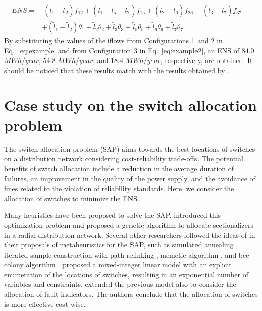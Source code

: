 \documentclass{article}
\begin{document}
\begin{align} 
	\displaystyle ENS =& \ (\tilde{l}_1-\tilde{l}_2)f_{12} + (\tilde{l}_1-\tilde{l}_5-\tilde{l}_2)f_{15} + (\tilde{l}_2-\tilde{l}_6)f_{26} + (\tilde{l}_3-\tilde{l}_7)f_{37} + \nonumber \\
	&+ (\tilde{l}_1-\tilde{l}_2)\theta_1 + \tilde{l}_2\theta_2 + \tilde{l}_3\theta_3 +  \tilde{l}_5\theta_5 + \tilde{l}_6\theta_6	+ \tilde{l}_7\theta_7
	\label{eq:example2}
\end{align}	
By substituting the values of the iflows from Configurations 1 and 2 in Eq.~\eqref{eq:example} and from Configuration 3 in Eq.~\eqref{eq:example2}, an ENS of $84.0$ $MWh/year$, $54.8$ $MWh/year$, and $18.4$ $MWh/year$, respectively, are obtained. It should be noticed that these results match with the results obtained by \cite{billinton}.



\section{Case study on the switch allocation problem} \label{sec:Optimization}

The switch allocation problem (SAP) aims towards the best  locations of switches on a distribution network considering  cost-reliability trade-offs. The potential benefits of switch allocation include a reduction in the average duration of failures, an improvement in the quality of the power supply, and the avoidance of fines related to the violation of reliability standards.
Here, we consider the allocation of switches to minimize the ENS. 

Many heuristics have been proposed to solve the SAP. \cite{levitin1994} introduced this optimization problem and proposed a genetic algorithm to allocate sectionalizers in a radial distribution network. 
Several other researchers followed the ideas of \cite{levitin1994} in their proposals of metaheuristics for the SAP, such as simulated annealing \cite{billinton2}, iterated sample construction with path relinking \cite{Benavides2013}, memetic algorithm \cite{assis2014}, and bee colony algorithm 
\cite{AmanEtal2016}.
\cite{JahromiEtal2012} proposed a mixed-integer linear model with an explicit enumeration of the locations of switches, resulting in an exponential number of variables and constraints.
\cite{FarajollahiFotuhiSafdarian2019} extended the previous model also to consider the allocation of fault indicators. The authors conclude that the allocation of switches is more  effective cost-wise.
\end{document}
